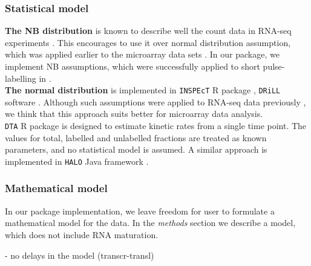 \subsubsection*{Statistical model}
\textbf{The NB distribution} is known to describe well the count data in RNA-seq 
experiments \citep{robinson2007moderated}. This encourages to use it over 
normal distribution assumption, which was applied earlier to the microarray data sets
\citep{miller2011dynamic}. In our package, we implement NB assumptions, which were
successfully applied to short pulse-labelling in \citep{eser2016determinants,
schwalb2016tt}.\\
\textbf{The normal distribution} is implemented in \verb|INSPEcT| R package \citep{de2015inspect},
\verb|DRiLL| software \citep{rabani2014high}. 
Although such assumptions 
were applied to RNA-seq data previously \citep{}, we think that this approach suits better 
for microarray data analysis.\\
\verb|DTA| R package \citep{schwalb2012measurement} is designed to
estimate kinetic rates from a single time point. The values for 
total, labelled and unlabelled fractions are treated as known parameters, and 
no statistical model is assumed. A similar approach is implemented in 
\verb|HALO| Java framework \citep{friedel2010halo}. 

\subsubsection*{Mathematical model}
In our package implementation, we leave freedom for user to formulate a mathematical
model for the data. In the \emph{methods} section we describe a model, which 
does not include RNA maturation.


- no delays in the model (transcr-transl)					
